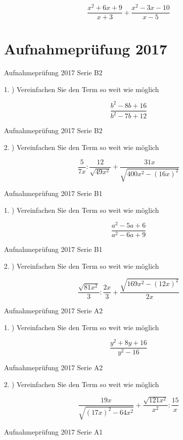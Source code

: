 $$\frac{x^2+6x+9}{x+3} + \frac{x^2-3x-10}{x-5}$$

\section*{Aufnahmeprüfung 2017}
Aufnahmeprüfung 2017 Serie B2

1. ) Vereinfachen Sie den Term so weit wie möglich

$$\frac{b^2-8b+16}{b^2-7b+12}$$

Aufnahmeprüfung 2017 Serie B2

2. ) Vereinfachen Sie den Term so weit wie möglich

$$\frac{5}{7x} : \frac{12}{\sqrt{49x^2}} + \frac{31x}{\sqrt{400x^2 - (16x)^2}}$$

Aufnahmeprüfung 2017 Serie B1

1. ) Vereinfachen Sie den Term so weit wie möglich

$$\frac{a^2-5a+6}{a^2-6a+9}$$

Aufnahmeprüfung 2017 Serie B1

2. ) Vereinfachen Sie den Term so weit wie möglich

$$\frac{\sqrt{81x^2}}{3} : \frac{2x}3 + \frac{\sqrt{169x^2 - (12x)^2}}{2x}$$

Aufnahmeprüfung 2017 Serie A2

1. ) Vereinfachen Sie den Term so weit wie möglich

$$\frac{y^2+8y+16}{y^2-16}$$

Aufnahmeprüfung 2017 Serie A2

2. ) Vereinfachen Sie den Term so weit wie möglich

$$\frac{19x}{\sqrt{(17x)^2 - 64x^2}} + \frac{\sqrt{121x^2}}{x^2} : \frac{15}{x}$$

Aufnahmeprüfung 2017 Serie A1

